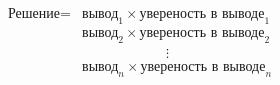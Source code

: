 \documentclass[preview]{standalone}
\begin{document}
\begin{align*}
\text{Решение}= &\text{вывод}_1 \times \text{увереность в выводе}_1\\ &\text{вывод}_2 \times \text{увереность в выводе}_2\\ &\qquad\qquad\qquad\vdots\\ &\text{вывод}_n \times \text{увереность в выводе}_n\\
\end{align*}
\end{document}
